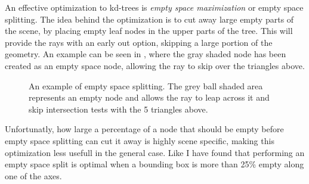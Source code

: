 An effective optimization to kd-trees is \textit{empty space
  maximization} or empty space splitting. The idea behind the
optimization is to cut away large empty parts of the scene, by placing
empty leaf nodes in the upper parts of the tree. This will provide the
rays with an early out option, skipping a large portion of the
geometry. An example can be seen in ,
where the gray shaded node has been created as an empty space node,
allowing the ray to skip over the triangles above.

\begin{figure}
  \centering
  \caption[Empty Space Splitting.]{An example of empty space
    splitting. The grey ball shaded area represents an empty node and
    allows the ray to leap across it and skip intersection tests with
    the 5 triangles above.}
  \label{fig:emptySpaceExample}
\end{figure}


Unfortunatly, how large a percentage of a node that should be empty
before empty space splitting can cut it away is highly scene specific,
making this optimization less usefull in the general case. Like \zhou{}
I have found that performing an empty space split is optimal when a
bounding box is more than 25\% empty along one of the axes.




